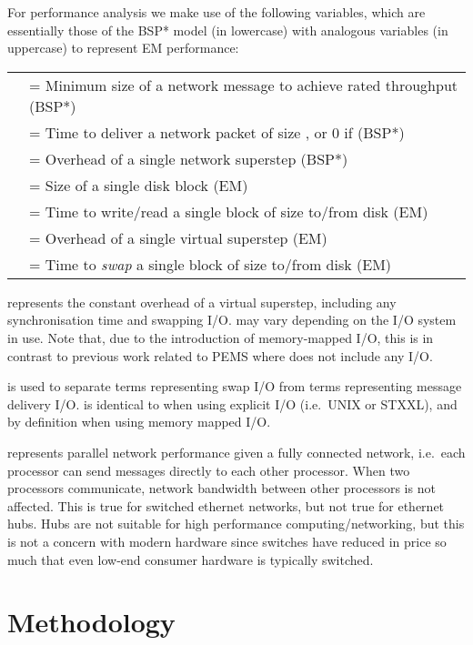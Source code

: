 \documentclass[12pt]{carletoncsthesis}
\begin{document}
For performance analysis we make use of the following variables,  which are
essentially those of the BSP* model (in lowercase) with analogous variables
(in uppercase) to represent EM performance:

\begin{center}
\begin{tabular}[ht]{ll}
 & = Minimum size of a network message to achieve rated throughput (BSP*)\\
 & = Time to deliver a network packet of size , or 0 if  (BSP*) \\
 & = Overhead of a single network superstep (BSP*) \\
 & = Size of a single disk block (EM) \\
 & = Time to write/read a single block of size  to/from disk (EM) \\
 & = Overhead of a single virtual superstep (EM) \\
 & = Time to {\em swap} a single block of size  to/from disk (EM)
\end{tabular}
\end{center}

 represents the constant overhead of a virtual superstep, including
any synchronisation time and swapping I/O.   may vary depending
on the I/O system in use.  Note that, due to the introduction of
memory-mapped I/O, this is in contrast to previous work related to PEMS
\cite{dhthesis}\cite{bspem}\cite{emsimulation}\cite{mnthesis}\cite{experimentswith}
where  does not include any I/O.

 is used to separate terms representing swap I/O from terms representing
message delivery I/O.   is identical to  when using explicit I/O (i.e.\
UNIX or STXXL), and  by definition when using memory mapped I/O.

 represents parallel network performance given a fully connected
network, i.e.\ each processor can send messages directly to each other
processor.  When two processors communicate, network bandwidth between other
processors is not affected.  This is true for switched ethernet networks,
but not true for ethernet hubs.  Hubs are not suitable for high performance
computing/networking, but this is not a concern with modern hardware since
switches have reduced in price so much that even low-end consumer hardware
is typically switched.


\chapter{Methodology}
\thispagestyle{empty}
\label{methodology}
\end{document}
